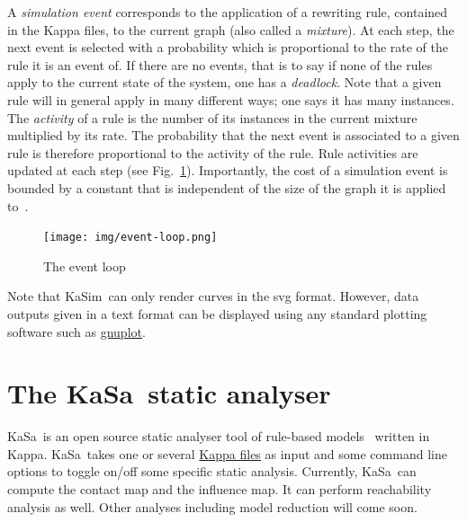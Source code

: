 \documentclass[11pt]{book}
\def\KaSim{\textsf{KaSim}}
\def\KaSa{\textsf{KaSa}}
\def\ie{ie }
\begin{document}
A \emph{simulation event} corresponds to the application of a rewriting rule, contained in the Kappa files, to the current graph (also called a \emph{mixture}). 
At each step, the next event %
is selected with a probability which is proportional to the rate of the rule it is an event of.
If there are no events, that is to say if none of the rules apply to the current state of the system, one has a \emph{deadlock}. Note that a given rule will in general apply in many different ways; one says it has many instances. The \emph{activity} of a rule is the number of its instances in the current mixture multiplied by its rate. The probability that the next event is associated to a given rule is therefore proportional to the activity of the rule.
Rule activities are updated at
each step (see Fig.~\ref{fig:event-loop}). Importantly, the cost of a simulation event is bounded by a constant that is independent of the size of the graph it is applied to~\cite{Dan_etal07b}. 

\begin{figure}[htbp]
\begin{center}
\texttt{[image: img/event-loop.png]}
\caption{The event loop}
\label{fig:event-loop}
\end{center}
\end{figure}

Note that \KaSim~can only render curves in the svg format. However, data outputs given in a text format can be displayed using any standard plotting software such as \href{http://www.gnuplot.info/}{gnuplot}.

\section{The \KaSa~static analyser}

\KaSa~is an open source static analyser  tool of rule-based models~\cite{DanLan04,Dan_etal07a,Fae_etal05} written in Kappa. \KaSa~takes one or several \hyperref[chap:kappa]{Kappa files} as input and some command line options to toggle on/off some specific static analysis. Currently, \KaSa~can compute the contact map and the influence map. It can perform reachability analysis \cite{Feret-ICCMSE2007,DanosEtAl-VMCAI08} as well.  Other analyses including  model reduction \cite{Feret-et-al-pnas2009,DanosEtAl-LICS2010,Feret-MFPSXXVII} will come soon. 
\end{document}
